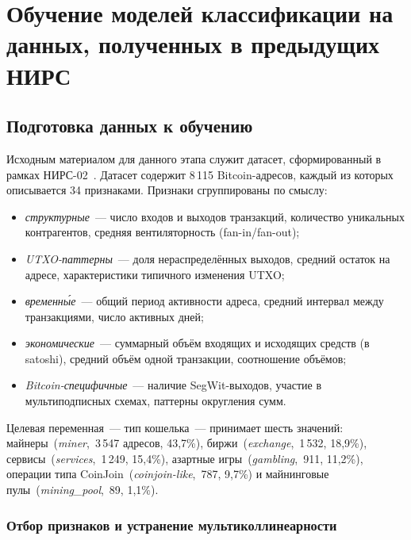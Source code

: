 \section{Обучение моделей классификации на данных, полученных в предыдущих НИРС}

\subsection{Подготовка данных к обучению}

Исходным материалом для данного этапа служит датасет, сформированный в рамках НИРС-02~\cite{github_repo_nirs2}. Датасет содержит 8\,115 Bitcoin-адресов, каждый из которых описывается 34 признаками. Признаки сгруппированы по смыслу:
\begin{itemize}
    \item \textit{структурные}~--- число входов и выходов транзакций, количество уникальных контрагентов, средняя вентиляторность (fan-in/fan-out);
    \item \textit{UTXO-паттерны}~--- доля нераспределённых выходов, средний остаток на адресе, характеристики типичного изменения UTXO;
    \item \textit{временны́е}~--- общий период активности адреса, средний интервал между транзакциями, число активных дней;
    \item \textit{экономические}~--- суммарный объём входящих и исходящих средств (в satoshi), средний объём одной транзакции, соотношение объёмов;
    \item \textit{Bitcoin-специфичные}~--- наличие SegWit-выходов, участие в мультиподписных схемах, паттерны округления сумм.
\end{itemize}

Целевая переменная~--- тип кошелька~--- принимает шесть значений: майнеры~(\textit{miner},~3\,547 адресов, 43,7\%), биржи~(\textit{exchange},~1\,532, 18,9\%), сервисы~(\textit{services},~1\,249, 15,4\%), азартные игры~(\textit{gambling},~911, 11,2\%), операции типа CoinJoin~(\textit{coinjoin-like},~787, 9,7\%) и майнинговые пулы~(\textit{mining\_pool},~89, 1,1\%).

\subsubsection{Отбор признаков и устранение мультиколлинеарности}

